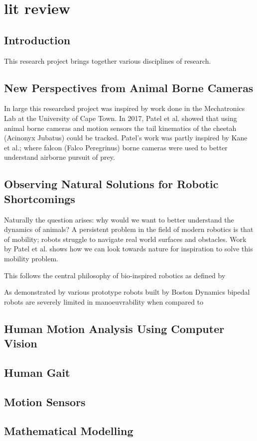 \chapter{lit review}

\section{Introduction}
This research project brings together various disciplines of research. 

\section{New Perspectives from Animal Borne Cameras}
In large this researched project was inspired by work done in the Mechatronics Lab at the University of Cape Town. In 2017, Patel et al.  \cite{patel2017trackingieee} showed that using animal borne cameras and motion sensors the tail kinematics of the cheetah (Acinonyx Jubatus) could be tracked. Patel's work was partly inspired by Kane et al.;\cite{kane2014falcons} where falcon (Falco Peregrinus) borne cameras were used to better understand airborne pursuit of prey.
 

\section{Observing Natural Solutions for Robotic Shortcomings}
Naturally the question arises:  why would we want to better understand the dynamics of animals? A persistent problem in the field of modern robotics is that of mobility; robots struggle to navigate real world surfaces and obstacles. Work by Patel et al. \cite{patel2013rapid} shows how we can look towards nature for inspiration to solve this mobility problem.

This follows the central philosophy of bio-inspired robotics as defined by 

As demonstrated by various prototype robots built by Boston Dynamics bipedal robots are severely limited in manoeuvrability when compared to   

\section{Human Motion Analysis Using Computer Vision}


\section{Human Gait}



\section{Motion Sensors}

\section{Mathematical Modelling}






